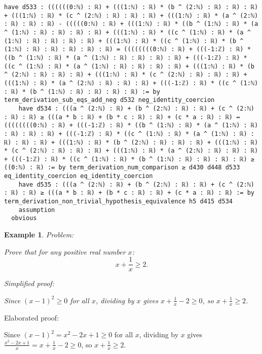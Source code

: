 \documentclass{article}
\newtheorem{example}{Example}
\begin{document}
\begin{tcolorbox}[colback=white!10, width=\linewidth]
\begin{lstlisting}[language=Lean4]
    have d533 : ((((((0:ℕ) : ℝ) + (((1:ℕ) : ℝ) * (b ^ (2:ℕ) : ℝ) : ℝ) : ℝ) + (((1:ℕ) : ℝ) * (c ^ (2:ℕ) : ℝ) : ℝ) : ℝ) + (((1:ℕ) : ℝ) * (a ^ (2:ℕ) : ℝ) : ℝ) : ℝ) - (((((0:ℕ) : ℝ) + (((1:ℕ) : ℝ) * ((b ^ (1:ℕ) : ℝ) * (a ^ (1:ℕ) : ℝ) : ℝ) : ℝ) : ℝ) + (((1:ℕ) : ℝ) * ((c ^ (1:ℕ) : ℝ) * (a ^ (1:ℕ) : ℝ) : ℝ) : ℝ) : ℝ) + (((1:ℕ) : ℝ) * ((c ^ (1:ℕ) : ℝ) * (b ^ (1:ℕ) : ℝ) : ℝ) : ℝ) : ℝ) : ℝ) = ((((((((0:ℕ) : ℝ) + (((-1:ℤ) : ℝ) * ((b ^ (1:ℕ) : ℝ) * (a ^ (1:ℕ) : ℝ) : ℝ) : ℝ) : ℝ) + (((-1:ℤ) : ℝ) * ((c ^ (1:ℕ) : ℝ) * (a ^ (1:ℕ) : ℝ) : ℝ) : ℝ) : ℝ) + (((1:ℕ) : ℝ) * (b ^ (2:ℕ) : ℝ) : ℝ) : ℝ) + (((1:ℕ) : ℝ) * (c ^ (2:ℕ) : ℝ) : ℝ) : ℝ) + (((1:ℕ) : ℝ) * (a ^ (2:ℕ) : ℝ) : ℝ) : ℝ) + (((-1:ℤ) : ℝ) * ((c ^ (1:ℕ) : ℝ) * (b ^ (1:ℕ) : ℝ) : ℝ) : ℝ) : ℝ) := by term_derivation_sub_eqs_add_neg d532 neg_identity_coercion
    have d534 : (((a ^ (2:ℕ) : ℝ) + (b ^ (2:ℕ) : ℝ) : ℝ) + (c ^ (2:ℕ) : ℝ) : ℝ) ≥ (((a * b : ℝ) + (b * c : ℝ) : ℝ) + (c * a : ℝ) : ℝ) ↔ ((((((((0:ℕ) : ℝ) + (((-1:ℤ) : ℝ) * ((b ^ (1:ℕ) : ℝ) * (a ^ (1:ℕ) : ℝ) : ℝ) : ℝ) : ℝ) + (((-1:ℤ) : ℝ) * ((c ^ (1:ℕ) : ℝ) * (a ^ (1:ℕ) : ℝ) : ℝ) : ℝ) : ℝ) + (((1:ℕ) : ℝ) * (b ^ (2:ℕ) : ℝ) : ℝ) : ℝ) + (((1:ℕ) : ℝ) * (c ^ (2:ℕ) : ℝ) : ℝ) : ℝ) + (((1:ℕ) : ℝ) * (a ^ (2:ℕ) : ℝ) : ℝ) : ℝ) + (((-1:ℤ) : ℝ) * ((c ^ (1:ℕ) : ℝ) * (b ^ (1:ℕ) : ℝ) : ℝ) : ℝ) : ℝ) ≥ ((0:ℕ) : ℝ) := by term_derivation_num_comparison ≥ d430 d448 d533 eq_identity_coercion eq_identity_coercion
    have d535 : (((a ^ (2:ℕ) : ℝ) + (b ^ (2:ℕ) : ℝ) : ℝ) + (c ^ (2:ℕ) : ℝ) : ℝ) ≥ (((a * b : ℝ) + (b * c : ℝ) : ℝ) + (c * a : ℝ) : ℝ) := by term_derivation_non_trivial_hypothesis_equivalence h5 d415 d534
    assumption
  obvious

\end{lstlisting}
\end{tcolorbox}


\begin{example}
Problem:
\begin{tcolorbox}[colback=yellow!10, width=\linewidth]
Prove that for any positive real number $x$:
    $$x + \frac{1}{x} \geq 2.$$
\end{tcolorbox}

Simplified proof:
\begin{tcolorbox}[colback=blue!10, width=\linewidth]
Since $(x-1)^2 \ge 0$ for all $x$, dividing by $x$ gives $x + \frac{1}{x} - 2 \ge 0$, so $x + \frac{1}{x} \ge 2$.
\end{tcolorbox}
\end{example}

Elaborated proof:
\begin{tcolorbox}[colback=green!10, width=\linewidth]
Since $(x-1)^2 = x^2 - 2x + 1 \ge 0$ for all $x$, dividing by $x$ gives $\frac{x^2 - 2x + 1}{x} = x + \frac{1}{x} - 2 \ge 0$, so $x + \frac{1}{x} \ge 2$.
\end{tcolorbox}
\end{document}
